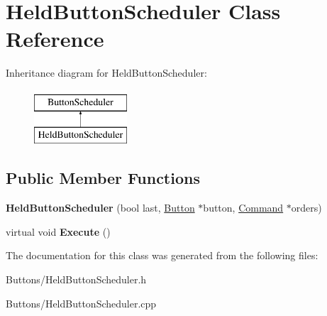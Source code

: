 \hypertarget{classHeldButtonScheduler}{
\section{HeldButtonScheduler Class Reference}
\label{classHeldButtonScheduler}
}
Inheritance diagram for HeldButtonScheduler:\begin{figure}[H]
\begin{center}
\leavevmode
\includegraphics[height=2.000000cm]{classHeldButtonScheduler}
\end{center}
\end{figure}
\subsection*{Public Member Functions}
\begin{DoxyCompactItemize}
\item 
\hypertarget{classHeldButtonScheduler_a308cbe01b2aa4f871352271f8873d757}{
{\bfseries HeldButtonScheduler} (bool last, \hyperlink{classButton}{Button} $\ast$button, \hyperlink{classCommand}{Command} $\ast$orders)}
\label{classHeldButtonScheduler_a308cbe01b2aa4f871352271f8873d757}

\item 
\hypertarget{classHeldButtonScheduler_a996e1cab372a69ef979a4db0dee55a67}{
virtual void {\bfseries Execute} ()}
\label{classHeldButtonScheduler_a996e1cab372a69ef979a4db0dee55a67}

\end{DoxyCompactItemize}


The documentation for this class was generated from the following files:\begin{DoxyCompactItemize}
\item 
Buttons/HeldButtonScheduler.h\item 
Buttons/HeldButtonScheduler.cpp\end{DoxyCompactItemize}
